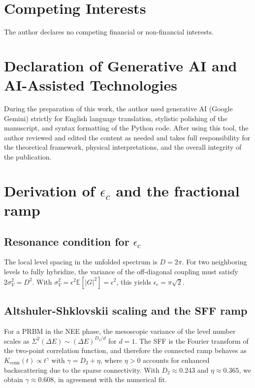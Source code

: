 \documentclass[11pt,a4paper]{article}
\begin{document}
\section*{Competing Interests}
The author declares no competing financial or non-financial interests.

\section*{Declaration of Generative AI and AI-Assisted Technologies}
During the preparation of this work, the author used generative AI (Google Gemini) strictly for English language translation, stylistic polishing of the manuscript, and syntax formatting of the Python code. After using this tool, the author reviewed and edited the content as needed and takes full responsibility for the theoretical framework, physical interpretations, and the overall integrity of the publication.

\appendix

\section{Derivation of \texorpdfstring{$\epsilon_c$}{epsilon\_c} and the fractional ramp}
\label{app:ramp}

\subsection{Resonance condition for \texorpdfstring{$\epsilon_c$}{epsilon\_c}}
The local level spacing in the unfolded spectrum is $D=2\pi$. For two neighboring levels to fully hybridize, the variance of the off-diagonal coupling must satisfy $2\sigma_V^2 = D^2$. With $\sigma_V^2 = \epsilon^2 \mathbb{E}[|G|^2] = \epsilon^2$, this yields $\epsilon_c = \pi\sqrt{2}$.

\subsection{Altshuler-Shklovskii scaling and the SFF ramp}
For a PRBM in the NEE phase, the mesoscopic variance of the level number scales as $\Sigma^2(\Delta E) \sim (\Delta E)^{D_2/d}$ for $d=1$. The SFF is the Fourier transform of the two-point correlation function, and therefore the connected ramp behaves as $K_{\text{conn}}(t) \propto t^{\gamma}$ with $\gamma = D_2 + \eta$, where $\eta>0$ accounts for enhanced backscattering due to the sparse connectivity. With $D_2\approx0.243$ and $\eta\approx0.365$, we obtain $\gamma\approx0.608$, in agreement with the numerical fit.
\end{document}
